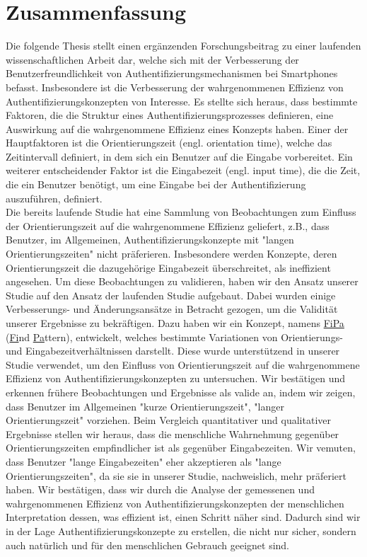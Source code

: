 \vfill

\chapter*{Zusammenfassung}
Die folgende Thesis stellt einen erg{\"a}nzenden Forschungsbeitrag zu einer laufenden wissenschaftlichen Arbeit dar, welche sich mit der Verbesserung der Benutzerfreundlichkeit von Authentifizierungsmechanismen bei Smartphones befasst. Insbesondere ist die Verbesserung der wahrgenommenen Effizienz von Authentifizierungskonzepten von Interesse. Es stellte sich heraus, dass bestimmte Faktoren, die die Struktur eines Authentifizierungsprozesses definieren, eine Auswirkung auf die wahrgenommene Effizienz eines Konzepts haben.
Einer der Hauptfaktoren ist die Orientierungszeit (engl. orientation time), welche das Zeitintervall definiert, in dem sich ein Benutzer auf die Eingabe vorbereitet. Ein weiterer entscheidender Faktor ist die Eingabezeit (engl. input time), die die Zeit, die ein Benutzer ben{\"o}tigt, um eine Eingabe bei der Authentifizierung auszuf{\"u}hren, definiert. \\

Die bereits laufende Studie hat eine Sammlung von Beobachtungen zum Einfluss der Orientierungszeit auf die wahrgenommene Effizienz geliefert, z.B., dass Benutzer, im Allgemeinen, Authentifizierungskonzepte mit "langen Orientierungszeiten" nicht pr{\"a}ferieren. Insbesondere werden Konzepte, deren Orientierungszeit die dazugeh{\"o}rige Eingabezeit {\"u}berschreitet, als ineffizient angesehen. Um diese Beobachtungen zu validieren, haben wir den Ansatz unserer Studie auf den Ansatz der laufenden Studie aufgebaut. Dabei wurden einige Verbesserungs- und {\"A}nderungsans{\"a}tze in Betracht gezogen, um die Validit{\"a}t unserer Ergebnisse zu bekr{\"a}ftigen. Dazu haben wir ein Konzept, namens \underline{FiPa} (\underline{Fi}nd \underline{Pa}ttern), entwickelt, welches bestimmte Variationen von Orientierungs- und Eingabezeitverh{\"a}ltnissen darstellt. Diese wurde unterst{\"u}tzend in unserer Studie verwendet, um den Einfluss von Orientierungszeit auf die wahrgenommene Effizienz von Authentifizierungskonzepten zu untersuchen. Wir best{\"a}tigen und erkennen fr{\"u}here Beobachtungen und Ergebnisse als valide an, indem wir zeigen, dass Benutzer im Allgemeinen "kurze Orientierungszeit", "langer Orientierungszeit" vorziehen. Beim Vergleich quantitativer und qualitativer Ergebnisse stellen wir heraus, dass die menschliche Wahrnehmung gegen{\"u}ber Orientierungszeiten empfindlicher ist als gegen{\"u}ber Eingabezeiten. Wir vemuten, dass Benutzer "lange Eingabezeiten" eher akzeptieren als "lange Orientierungszeiten", da sie sie in unserer Studie, nachweislich, mehr pr{\"a}feriert haben. Wir best{\"a}tigen, dass wir durch die Analyse der gemessenen und wahrgenommenen Effizienz von Authentifizierungskonzepten der menschlichen Interpretation dessen, was effizient ist, einen Schritt n{\"a}her sind. Dadurch sind wir in der Lage Authentifizierungskonzepte zu erstellen, die nicht nur sicher, sondern auch nat{\"u}rlich und f{\"u}r den menschlichen Gebrauch geeignet sind.


\endgroup			

\vfill 